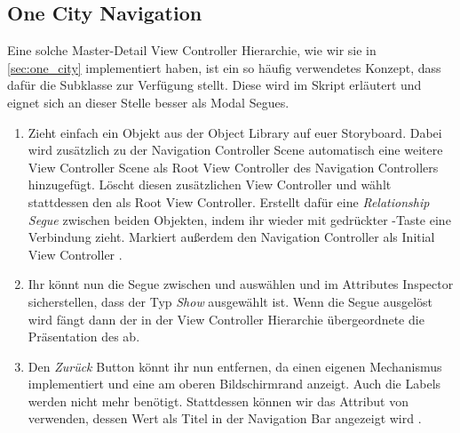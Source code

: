 \documentclass[parskip=half, final]{scrreprt}
\begin{document}
\begin{lecture}


\section{One City Navigation}

Eine solche Master-Detail View Controller Hierarchie, wie wir sie in \autoref{sec:one_city} implementiert haben, ist ein so häufig verwendetes Konzept, dass  dafür die Subklasse  zur Verfügung stellt. Diese wird im Skript erläutert und eignet sich an dieser Stelle besser als Modal Segues.

\begin{enumerate}

\item Zieht einfach ein  Objekt aus der Object Library auf euer Storyboard. Dabei wird zusätzlich zu der Navigation Controller Scene automatisch eine weitere View Controller Scene als Root View Controller des Navigation Controllers hinzugefügt. Löscht diesen zusätzlichen View Controller und wählt stattdessen den  als Root View Controller. Erstellt dafür eine \emph{Relationship Segue} zwischen beiden Objekten, indem ihr wieder mit gedrückter \keys{\ctrl}-Taste eine Verbindung zieht. Markiert außerdem den Navigation Controller als Initial View Controller .


\item Ihr könnt nun die Segue zwischen  und  auswählen und im Attributes Inspector sicherstellen, dass der Typ \emph{Show} ausgewählt ist. Wenn die Segue ausgelöst wird fängt dann der in der View Controller Hierarchie übergeordnete  die Präsentation des  ab.

\item Den \emph{Zurück} Button könnt ihr nun entfernen, da  einen eigenen Mechanismus implementiert und eine  am oberen Bildschirmrand anzeigt. Auch die Labels werden nicht mehr benötigt. Stattdessen können wir das  Attribut von  verwenden, dessen Wert als Titel in der Navigation Bar angezeigt wird .


\end{enumerate}
\end{lecture}
\end{document}
